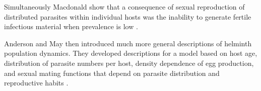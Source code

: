 \documentclass[12pt,a4paper]{article}
\theoremstyle{plain}%
\theoremstyle{definition}
\theoremstyle{remark}
\begin{document}
 	
 	Simultaneously Macdonald show that a consequence of sexual reproduction of distributed parasites within individual hosts was the inability to generate fertile infectious material when prevalence is low \cite{macdonald1965dynamics}.
 	

 	
 	Anderson and May then introduced much more general descriptions of helminth population dynamics. They developed descriptions for a model based on host age, distribution of parasite numbers per host, density dependence of egg production, and sexual mating functions that depend on parasite distribution and reproductive habits \cite{anderson1982population,anderson1992infectious}.
 	
 	{\color{red}
 	
}
\end{document}
